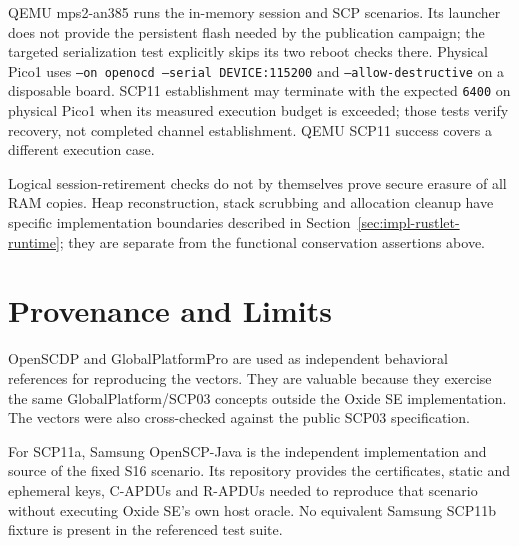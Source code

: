 QEMU mps2-an385 runs the in-memory session and SCP scenarios. Its launcher
does not provide the persistent flash needed by the publication campaign;
the targeted serialization test explicitly skips its two reboot checks there.
Physical Pico1 uses \texttt{--on openocd --serial DEVICE:115200} and
\texttt{--allow-destructive} on a disposable board. SCP11 establishment may
terminate with the expected \texttt{6400} on physical Pico1 when its measured
execution budget is exceeded; those tests verify recovery, not completed
channel establishment. QEMU SCP11 success covers a different execution case.

Logical session-retirement checks do not by themselves prove secure erasure
of all RAM copies. Heap reconstruction, stack scrubbing and allocation
cleanup have specific implementation boundaries described in
Section~\ref{sec:impl-rustlet-runtime}; they are separate from the functional
conservation assertions above.

\section{Provenance and Limits}

OpenSCDP and GlobalPlatformPro are used as independent behavioral references
for reproducing the vectors. They are valuable because they exercise the same
GlobalPlatform/SCP03 concepts outside the Oxide SE implementation. The vectors
were also cross-checked against the public SCP03 specification.

For SCP11a, Samsung OpenSCP-Java is the independent implementation and source
of the fixed S16 scenario. Its repository provides the certificates, static
and ephemeral keys, C-APDUs and R-APDUs needed to reproduce that scenario
without executing Oxide SE's own host oracle. No equivalent Samsung SCP11b
fixture is present in the referenced test suite.

